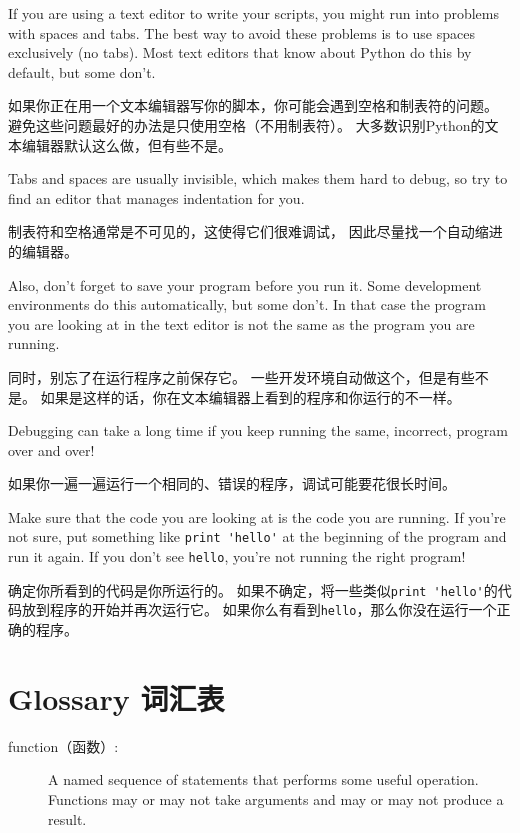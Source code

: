 \documentclass[10pt]{book}
\begin{document}
\begin{CJK}{UTF8}{gbsn}
If you are using a text editor to write your scripts, you might
run into problems with spaces and tabs.  The best way to avoid
these problems is to use spaces exclusively (no tabs).  Most text
editors that know about Python do this by default, but some
don't.

如果你正在用一个文本编辑器写你的脚本，你可能会遇到空格和制表符的问题。
避免这些问题最好的办法是只使用空格（不用制表符）。
大多数识别Python的文本编辑器默认这么做，但有些不是。

Tabs and spaces are usually invisible, which makes them
hard to debug, so try to find an editor that manages indentation
for you.

制表符和空格通常是不可见的，这使得它们很难调试，
因此尽量找一个自动缩进的编辑器。

Also, don't forget to save your program before you run it.  Some
development environments do this automatically, but some don't.
In that case the program you are looking at in the text editor
is not the same as the program you are running.

同时，别忘了在运行程序之前保存它。
一些开发环境自动做这个，但是有些不是。
如果是这样的话，你在文本编辑器上看到的程序和你运行的不一样。

Debugging can take a long time if you keep running the same,
incorrect, program over and over!

如果你一遍一遍运行一个相同的、错误的程序，调试可能要花很长时间。

Make sure that the code you are looking at is the code you are running.
If you're not sure, put something like \verb"print 'hello'" at the
beginning of the program and run it again.  If you don't see
\verb"hello", you're not running the right program!

确定你所看到的代码是你所运行的。
如果不确定，将一些类似\verb"print 'hello'"的代码放到程序的开始并再次运行它。
如果你么有看到\verb"hello"，那么你没在运行一个正确的程序。


\section{Glossary 词汇表}

\begin{description}

\item[function（函数）:] A named sequence of statements that performs some
useful operation.  Functions may or may not take arguments and may or
may not produce a result.


\end{description}
\end{CJK}
\end{document}
